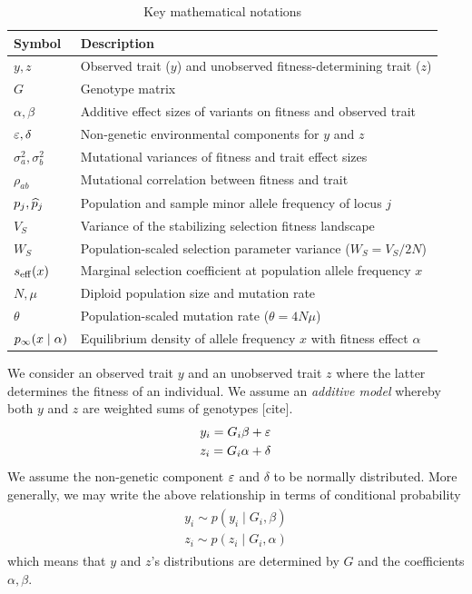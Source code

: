 \documentclass[10pt]{article}
\begin{document}
\begin{table}[htpb]
    \centering
    \caption{Key mathematical notations}
    \label{tab:notation}
    \vspace{0.5em}
    \begin{tabular}{ll}
        \hline
        Symbol & Description \\
        \hline
        $y, z$ & Observed trait ($y$) and unobserved fitness-determining trait ($z$) \\
        $G$ & Genotype matrix \\
        $\alpha, \beta$ & Additive effect sizes of variants on fitness and observed trait \\
        ${{\varepsilon}}, \delta$ & Non-genetic environmental components for $y$ and $z$ \\
        $\sigma_a^2, \sigma_b^2$ & Mutational variances of fitness and trait effect sizes \\
        $\rho_{ab}$ & Mutational correlation between fitness and trait \\
        $p_j, \widehat{p}_j$ & Population and sample minor allele frequency of locus $j$ \\
        $V_S$ & Variance of the stabilizing selection fitness landscape \\
        $W_S$ & Population-scaled selection parameter variance ($W_S = V_S / 2N$) \\
        $s_{\mathrm{eff}}(x)$ & Marginal selection coefficient at population allele frequency $x$ \\
        $N, \mu$ & Diploid population size and mutation rate \\
        $\theta$ & Population-scaled mutation rate ($\theta = 4N\mu$) \\
        $p_{\infty}(x \mid \alpha)$ & Equilibrium density of allele frequency $x$ with fitness effect $\alpha$ \\
        \hline
    \end{tabular}
\end{table}
We consider an observed trait $y$ and an unobserved trait $z$ where the latter determines the fitness of an individual.
We assume an \emph{additive model} whereby both $y$ and $z$ are weighted sums of genotypes [cite].
\begin{gather}
    \begin{gathered}
        y_i = G_i\beta + {{\varepsilon}} \\
        z_i = G_i\alpha + \delta
    \end{gathered}
\end{gather}
We assume the non-genetic component ${{\varepsilon}}$ and $\delta$ to be normally distributed.
More generally, we may write the above relationship in terms of conditional probability
\begin{gather} \label{eq:trait_and_fitness}
    \begin{gathered}
        y_i \sim p(y_i \mid G_i, \beta) \\
        z_i \sim p(z_i \mid G_i, \alpha)
    \end{gathered}
\end{gather}
which means that $y$ and $z$'s distributions are determined by $G$ and the coefficients $\alpha, \beta$.
\end{document}
